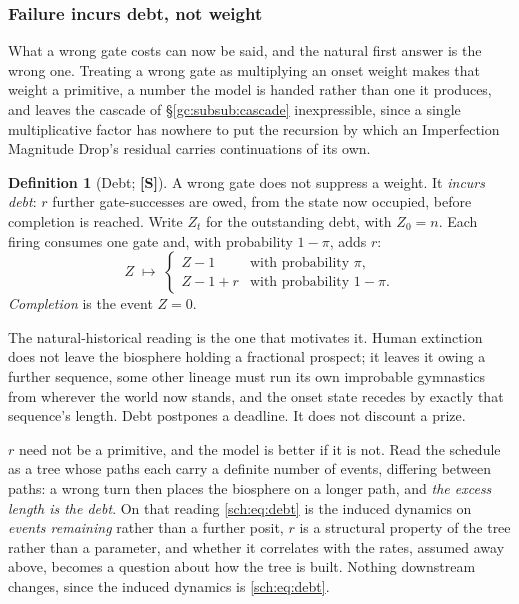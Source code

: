 \documentclass[11pt]{article}
\numberwithin{equation}{section}
\theoremstyle{plain}
\theoremstyle{definition}
\newtheorem{definition}[theorem]{Definition}
\theoremstyle{remark}
\begin{document}
\subsubsection{Failure incurs debt, not weight}\label{sch:subsub:debt}

What a wrong gate costs can now be said, and the natural first answer is
the wrong one. Treating a wrong gate as multiplying an onset weight
makes that weight a primitive, a number the model is handed rather
than one it produces, and leaves the cascade of
\S\ref{gc:subsub:cascade} inexpressible, since a single multiplicative
factor has nowhere to put the recursion by which an Imperfection
Magnitude Drop's residual carries continuations of its own.

\begin{definition}[Debt; \textbf{[S]}]\label{sch:def:debt}
A wrong gate does not suppress a weight. It \emph{incurs debt}: $r$
further gate-successes are owed, from the state now occupied, before
completion is reached. Write $Z_t$ for the outstanding debt, with
$Z_0=n$. Each firing consumes one gate and, with probability $1-\pi$,
adds $r$:
\begin{equation}\label{sch:eq:debt}
Z\;\longmapsto\;
\begin{cases}
Z-1 & \text{with probability }\pi,\\
Z-1+r & \text{with probability }1-\pi .
\end{cases}
\end{equation}
\emph{Completion} is the event $Z=0$.
\end{definition}

The natural-historical reading is the one that motivates it. Human
extinction does not leave the biosphere holding a fractional prospect;
it leaves it owing a further sequence, some other lineage must run
its own improbable gymnastics from wherever the world now stands, and
the onset state recedes by exactly that sequence's length. Debt
postpones a deadline. It does not discount a prize.

$r$ need not be a primitive, and the model is better if it is not. Read
the schedule as a tree whose paths each carry a definite number of
events, differing between paths: a wrong turn then places the biosphere
on a longer path, and \emph{the excess length is the debt}. On that
reading \eqref{sch:eq:debt} is the induced dynamics on \emph{events
remaining} rather than a further posit, $r$ is a structural property of
the tree rather than a parameter, and whether it correlates with the
rates, assumed away above, becomes a question about how the tree
is built. Nothing downstream changes, since the induced dynamics is
\eqref{sch:eq:debt}.
\end{document}

